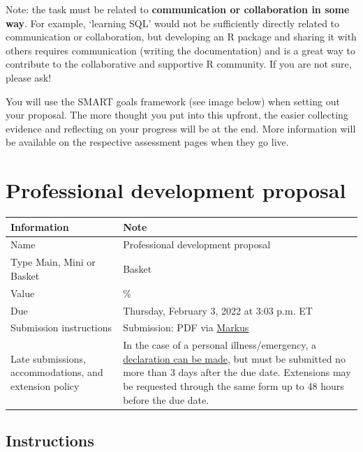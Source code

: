\documentclass[
  openany]{book}
\begin{document}
Note: the task must be related to \textbf{communication or collaboration in some way}. For example, `learning SQL' would not be sufficiently directly related to communication or collaboration, but developing an R package and sharing it with others requires communication (writing the documentation) and is a great way to contribute to the collaborative and supportive R community. If you are not sure, please ask!

You will use the SMART goals framework (see image below) when setting out your proposal. The more thought you put into this upfront, the easier collecting evidence and reflecting on your progress will be at the end. More information will be available on the respective assessment pages when they go live.

\hypertarget{professional-development-proposal}{%
\section{Professional development proposal}\label{professional-development-proposal}}

\begin{longtable}[]{@{}
  >{\raggedright\arraybackslash}p{}
  >{\raggedright\arraybackslash}p{}@{}}
\toprule
\textbf{Information} & \textbf{Note} \\
\midrule
\endhead
Name & Professional development proposal \\
Type Main, Mini or Basket & Basket \\
Value & 1\% \\
Due & Thursday, February 3, 2022 at 3:03 p.m. ET \\
Submission instructions & Submission: PDF via \href{https://markus-ds.teach.cs.toronto.edu/}{Markus} \\
Late submissions, accommodations, and extension policy & In the case of a personal illness/emergency, a \href{https://forms.office.com/Pages/ResponsePage.aspx?id=JsKqeAMvTUuQN7RtVsVSEOKHUU3SzAJJhmOKjJhDWEpUNTFDSzhZTFlXUzVYMVlNM1FEUTRZMkVWOC4u}{declaration can be made}, but must be submitted no more than 3 days after the due date. Extensions may be requested through the same form up to 48 hours before the due date. \\
\bottomrule
\end{longtable}

\hypertarget{instructions-6}{%
\subsection{Instructions}\label{instructions-6}}
\end{document}
